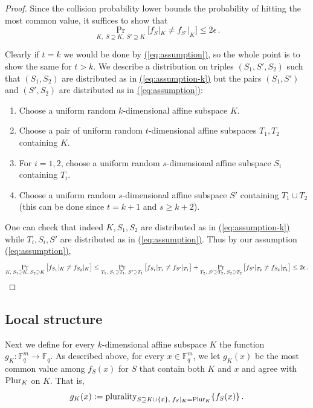 \documentclass{toc}
\renewcommand{\eqref}[1]{\hyperref[#1]{(\ref*{#1})}}
\theoremstyle{plain}
\newcommand{\E}{{\mathbb{E}}}
\newcommand{\F}{{\mathbb{F}}}
\newcommand{\eps}{\epsilon}
\newcommand{\plurality}{{\rm{plurality}}}
\newcommand{\pl}{{\rm{Plur}}}
\begin{document}
\begin{proof}
Since the collision probability lower bounds the probability of hitting the most common value, it suffices to show that
\begin{equation}\label{eq:assumption-k}
\Pr_{K, \; S \supseteq K,\;S' \supseteq K}\big[f_S|_K \neq f_{S'}|_K\big] \leq 2\epsilon\,.
\end{equation}

Clearly if $t=k$ we would be done by \eqref{eq:assumption}, so the whole point is to show the same for $t>k$. We describe a distribution on triples $(S_1,S',S_2)$ such that $(S_1,S_2)$ are distributed as in \eqref{eq:assumption-k} but the pairs $(S_1,S')$ and $(S',S_2)$ are distributed as in \eqref{eq:assumption}:
\begin{enumerate}
  \item Choose a uniform random $k$-dimensional affine subspace $K$.
  \item Choose a pair of uniform random $t$-dimensional affine subspaces $T_1,T_2$ containing $K$.
    \item For $i=1,2$, choose a uniform random $s$-dimensional affine subspace $S_i$ containing $T_i$.
  \item Choose a uniform random $s$-dimensional affine subspace $S'$ containing $T_1 \cup T_2$ (this can be done since $t=k+1$ and $s\geq k+2$).
\end{enumerate}

One can check that indeed $K,S_1,S_2$ are distributed as in \eqref{eq:assumption-k}  while  $T_i,S_i,S'$ are distributed as in \eqref{eq:assumption}. Thus by our assumption \eqref{eq:assumption},
\[ \Pr_{K, \; S_1 \supseteq K,\;S_2 \supseteq K}\big[f_{S_1}|_K \neq
  f_{S_2}|_K\big] \le   \Pr_{T_1, \; S_1 \supseteq T_1,\;S' \supseteq
    T_1}\big[ f_{S_1}|_{T_1}\neq f_{S'}|_{T_1}\big] + \Pr_{T_2, \; S'
    \supseteq T_2,\;S_2 \supseteq T_2}\big[f_{S'}|_{T_2}\neq
  f_{S_2}|_{T_2}\big] \le 2\eps\,. \qedhere \]
\end{proof}
%
%

\subsection{Local structure}\label{subsec:local-struct}

Next we define for every $k$-dimensional affine subspace $K$ the function $g_K: \F_q^m \to \F_q$. As described above,  for every $x \in \F_q^m$, we let $g_K(x)$ be the most common value among $f_S(x)$ for $S$ that contain both $K$ and $x$ and agree with $\pl_K$ on $K$. That is,
\[g_K(x) : = \plurality_{S \supseteq K \cup \{x\},\; f_S|_K = \pl_K} \{f_S(x)\}\,.\]
\end{document}
